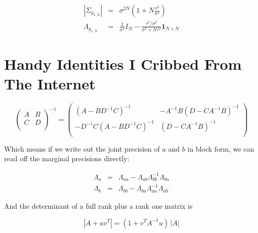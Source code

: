 \documentclass[11pt]{article}
\begin{document}
\begin{eqnarray*}
|\Sigma_{y_{1:N}}| & = & \sigma^{2N}\left(1 + N\frac{\tau^2}{\sigma^2}\right) \\
\Lambda_{y_{1:N}} & = & \frac{1}{\sigma^2}I_N - \frac{\tau^2/\sigma^2}{\sigma^2 + N\tau^2} \mathbf{1}_{N\times N}
\end{eqnarray*}

\section{Handy Identities I Cribbed From The Internet}
\begin{equation}
\left(\begin{array}{cc}
A & B \\
C & D \\
\end{array}\right)^{-1} =
\left(\begin{array}{cc}
(A - BD^{-1}C)^{-1} &  -A^{-1}B(D-CA^{-1}B)^{-1} \\
-D^{-1}C(A - BD^{-1}C)^{-1} & (D-CA^{-1}B)^{-1} \\
\end{array}\right) 
\end{equation}

Which means if we write out the joint precision of $a$ and $b$ in block form, we can read off the marginal precisions directly:

\begin{eqnarray}
\Lambda_{a} & = & \Lambda_{aa} - \Lambda_{ab}\Lambda_{bb}^{-1}\Lambda_{ba} \nonumber \\
\Lambda_{b} & = & \Lambda_{bb} - \Lambda_{ba}\Lambda_{aa}^{-1}\Lambda_{ab}
\end{eqnarray}

And the determinant of a full rank plus a rank one matrix is

\begin{equation}
|A + uv^T| = (1 + v^TA^{-1}u)\,|A|
\end{equation}
\end{document}
